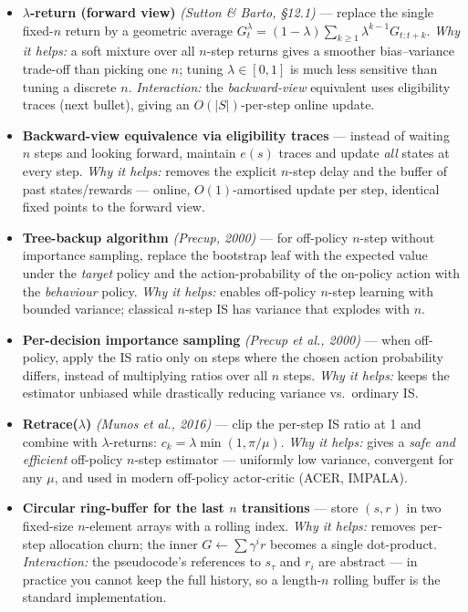 \documentclass[11pt]{article}
\begin{document}
\begin{itemize}
\item
  \label{trick-2-3-1}\textbf{\(\lambda\)-return (forward
  view)} \emph{(Sutton \& Barto, §12.1)} --- replace the single
  fixed-\(n\) return by a geometric average
  \(G_t^\lambda = (1-\lambda)\sum_{k\geq 1}\lambda^{k-1} G_{t:t+k}\).
  \emph{Why it helps:} a soft mixture over all \(n\)-step returns gives
  a smoother bias--variance trade-off than picking one \(n\); tuning
  \(\lambda\in[0,1]\) is much less sensitive than tuning a discrete
  \(n\). \emph{Interaction:} the \emph{backward-view} equivalent uses
  eligibility traces (next bullet), giving an \(O(|S|)\)-per-step online
  update.
\item
  \label{trick-2-3-2}\textbf{Backward-view equivalence
  via eligibility traces} --- instead of waiting \(n\) steps and looking
  forward, maintain \(e(s)\) traces and update \emph{all} states at
  every step. \emph{Why it helps:} removes the explicit \(n\)-step delay
  and the buffer of past states/rewards --- online, \(O(1)\)-amortised
  update per step, identical fixed points to the forward view.
\item
  \label{trick-2-3-3}\textbf{Tree-backup algorithm}
  \emph{(Precup, 2000)} --- for off-policy \(n\)-step without importance
  sampling, replace the bootstrap leaf with the expected value under the
  \emph{target} policy and the action-probability of the on-policy
  action with the \emph{behaviour} policy. \emph{Why it helps:} enables
  off-policy \(n\)-step learning with bounded variance; classical
  \(n\)-step IS has variance that explodes with \(n\).
\item
  \label{trick-2-3-4}\textbf{Per-decision importance
  sampling} \emph{(Precup et al., 2000)} --- when off-policy, apply the
  IS ratio only on steps where the chosen action probability differs,
  instead of multiplying ratios over all \(n\) steps. \emph{Why it
  helps:} keeps the estimator unbiased while drastically reducing
  variance vs.~ordinary IS.
\item
  \label{trick-2-3-5}\textbf{Retrace(\(\lambda\))}
  \emph{(Munos et al., 2016)} --- clip the per-step IS ratio at 1 and
  combine with \(\lambda\)-returns: \(c_k = \lambda\min(1, \pi/\mu)\).
  \emph{Why it helps:} gives a \emph{safe and efficient} off-policy
  \(n\)-step estimator --- uniformly low variance, convergent for any
  \(\mu\), and used in modern off-policy actor-critic (ACER, IMPALA).
\item
  \label{trick-2-3-6}\textbf{Circular ring-buffer for the
  last \(n\) transitions} --- store \((s,r)\) in two fixed-size
  \(n\)-element arrays with a rolling index. \emph{Why it helps:}
  removes per-step allocation churn; the inner
  \(G\leftarrow \sum \gamma^{i}r\) becomes a single dot-product.
  \emph{Interaction:} the pseudocode's references to \(s_\tau\) and
  \(r_i\) are abstract --- in practice you cannot keep the full history,
  so a length-\(n\) rolling buffer is the standard implementation.
\end{itemize}
\end{document}
